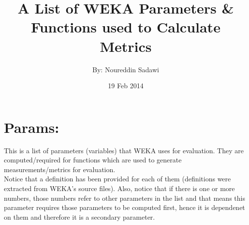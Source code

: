 \documentclass[a4paper,12pt]{article}
\begin{document}
\title{A List of WEKA Parameters \& Functions used to Calculate Metrics}
\date{19 Feb 2014}
\author{By: Noureddin Sadawi}
\maketitle

\section{Params:}
This is a list of parameters (variables) that WEKA uses for evaluation. They are computed/required for functions which are used to generate measurements/metrics for evaluation.\\

Notice that a definition has been provided for each of them (definitions were extracted from WEKA's source files). Also, notice that if there is one or more numbers, those numbers refer to other parameters in the list and that means this parameter requires those parameters to be computed first, hence it is dependenet on them and therefore it is a secondary parameter.
\end{document}
